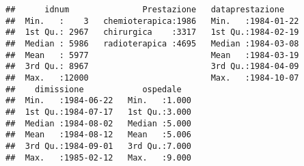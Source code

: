 \documentclass[]{article}
\newenvironment{Shaded}{\begin{snugshade}}{\end{snugshade}}
\newcommand{\NormalTok}[1]{#1}
\newcommand{\OperatorTok}[1]{\textcolor[rgb]{0.81,0.36,0.00}{\textbf{#1}}}
\newcommand{\StringTok}[1]{\textcolor[rgb]{0.31,0.60,0.02}{#1}}
\begin{document}
\begin{verbatim}
##      idnum               Prestazione   dataprestazione     
##  Min.   :    3   chemioterapica:1986   Min.   :1984-01-22  
##  1st Qu.: 2967   chirurgica    :3317   1st Qu.:1984-02-19  
##  Median : 5986   radioterapica :4695   Median :1984-03-08  
##  Mean   : 5977                         Mean   :1984-03-19  
##  3rd Qu.: 8967                         3rd Qu.:1984-04-09  
##  Max.   :12000                         Max.   :1984-10-07  
##    dimissione            ospedale    
##  Min.   :1984-06-22   Min.   :1.000  
##  1st Qu.:1984-07-17   1st Qu.:3.000  
##  Median :1984-08-02   Median :5.000  
##  Mean   :1984-08-12   Mean   :5.006  
##  3rd Qu.:1984-09-01   3rd Qu.:7.000  
##  Max.   :1985-02-12   Max.   :9.000
\end{verbatim}

\begin{Shaded}
\end{Shaded}
\end{document}
